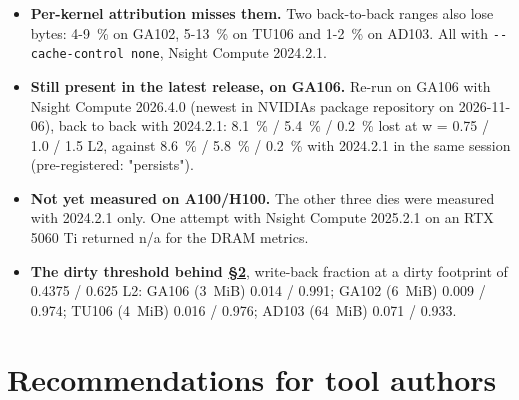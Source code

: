\documentclass[11pt,a4paper]{article}
\providecommand{\tightlist}{\setlength{\itemsep}{0pt}\setlength{\parskip}{0pt}}
\begin{document}
\begin{itemize}
\tightlist
\item
  \textbf{Per-kernel attribution misses them.} Two back-to-back ranges also lose bytes: 4-9~\% on GA102, 5-13~\% on TU106
  and 1-2~\% on AD103. All with \texttt{-\/-cache-control\ none}, Nsight Compute 2024.2.1.
\item
  \textbf{Still present in the latest release, on GA106.} Re-run on GA106 with Nsight Compute 2026.4.0 (newest in NVIDIA\textquotesingle s package
  repository on 2026-11-06), back to back with 2024.2.1: 8.1~\% / 5.4~\% / 0.2~\% lost at w = 0.75 / 1.0 / 1.5 L2, against
  8.6~\% / 5.8~\% / 0.2~\% with 2024.2.1 in the same session (pre-registered: "persists").
\item
  \textbf{Not yet measured on A100/H100.} The other three dies were measured with 2024.2.1 only. One attempt with Nsight Compute
  2025.2.1 on an RTX 5060 Ti returned n/a for the DRAM metrics.
\item
  \textbf{The dirty threshold behind \hyperref[background]{\S{}2}}, write-back fraction at a dirty footprint of 0.4375 / 0.625 L2: GA106 (3~MiB)
  0.014 / 0.991; GA102 (6~MiB) 0.009 / 0.974; TU106 (4~MiB) 0.016 / 0.976; AD103 (64~MiB) 0.071 / 0.933.
\end{itemize}

\section{Recommendations for tool authors}\label{recommendations-for-tool-authors}
\end{document}
